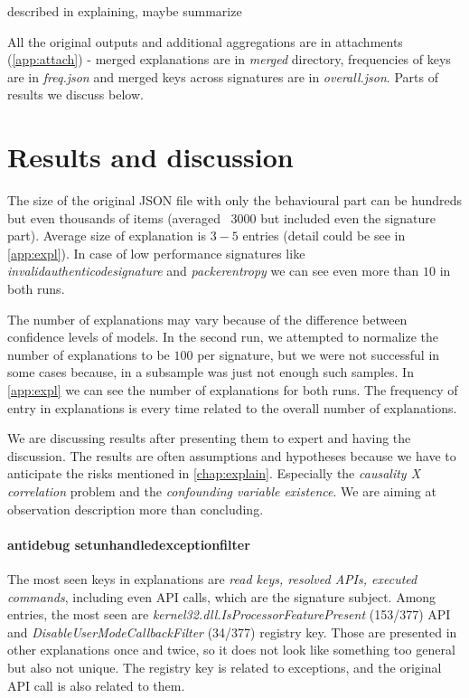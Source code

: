 described in explaining, maybe summarize

All the original outputs and additional aggregations are in attachments (\ref{app:attach}) - merged explanations are in \emph{merged} directory, frequencies of keys are in \emph{freq.json} and merged keys across signatures are in \emph{overall.json}. Parts of results we discuss below.


\section{Results and discussion}
The size of the original JSON file with only the behavioural part can be hundreds but even thousands of items (averaged \texttildelow~$3000$ but included even the signature part). Average size of explanation is $3-5$ entries (detail could be see in \ref{app:expl}). In case of low performance signatures like \emph{invalidauthenticodesignature} and \emph{packerentropy} we can see even more than $10$ in both runs.

The number of explanations may vary because of the difference between confidence levels of models. In the second run, we attempted to normalize the number of explanations to be $100$ per signature, but we were not successful in some cases because, in a subsample was just not enough such samples.  In \ref{app:expl} we can see the number of explanations for both runs. The frequency of entry in explanations is every time related to the overall number of explanations.

We are discussing results after presenting them to expert and having the discussion. The results are often assumptions and hypotheses because we have to anticipate the risks mentioned in \ref{chap:explain}. Especially the \emph{causality X correlation} problem and the \emph{confounding variable existence}. We are aiming at observation description more than concluding.

\paragraph{antidebug setunhandledexceptionfilter}
The most seen keys in explanations are \emph{read keys, resolved APIs, executed commands}, including even API calls, which are the signature subject. Among entries, the most seen are \emph{kernel32.dll.IsProcessorFeaturePresent} (153/377) API and \emph{DisableUserModeCallbackFilter} (34/377) registry key. Those are presented in other explanations once and twice, so it does not look like something too general but also not unique. The registry key is related to exceptions, and the original API call is also related to them.

